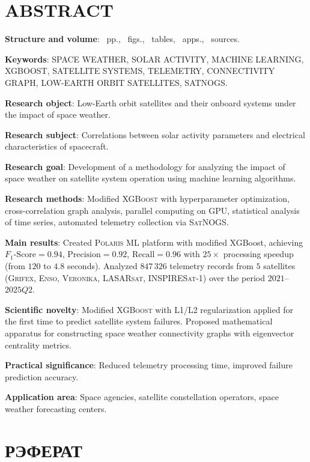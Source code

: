 \chapter*{ABSTRACT}

\textbf{Structure and volume}: \maincontentpages~pp., \totalfigures~figs.,
\totaltables~tables, ~apps., \thetotalsources~sources.

\textbf{Keywords}: SPACE WEATHER, SOLAR ACTIVITY, MACHINE LEARNING, XGBOOST,
SATELLITE SYSTEMS, TELEMETRY, CONNECTIVITY GRAPH, LOW-EARTH ORBIT SATELLITES,
SATNOGS.

\textbf{Research object}: Low-Earth orbit satellites and their onboard systems under the impact of space weather.

\textbf{Research subject}: Correlations between solar activity parameters and electrical characteristics of spacecraft.

\textbf{Research goal}: Development of a methodology for analyzing the impact of space weather on satellite system operation using machine learning algorithms.

\textbf{Research methods}: Modified \textsc{XGBoost} with hyperparameter optimization, cross-correlation graph analysis, parallel computing on \textsc{GPU}, statistical analysis of time series, automated telemetry collection via \textsc{SatNOGS}.

\textbf{Main results}: Created \textsc{Polaris ML} platform with modified XGBoost, achieving $F_1\text{-Score} = 0.94$,
$\text{Precision} = 0.92$, $\text{Recall} = 0.96$ with $25{\times}$ processing speedup (from $120$ to $4.8$ seconds). Analyzed $847{\,}326$ telemetry records from $5$ satellites (\textsc{Grifex}, \textsc{Enso}, \textsc{Veronika}, \textsc{LASARsat}, \textsc{INSPIRESat-1}) over the period $2021$--$2025Q2$.

\textbf{Scientific novelty}: Modified \textsc{XGBoost} with L1/L2 regularization applied for the first time to predict satellite system failures. Proposed mathematical apparatus for constructing space weather connectivity graphs with eigenvector centrality metrics.

\textbf{Practical significance}: Reduced telemetry processing time, improved failure prediction accuracy.

\textbf{Application area}: Space agencies, satellite constellation operators, space weather forecasting centers.





\chapter*{РЭФЕРАТ}

